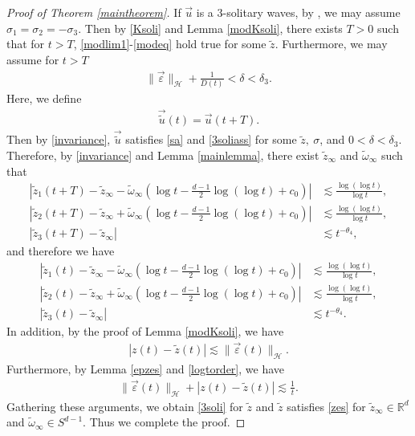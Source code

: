 \documentclass[reqno]{amsart}
\theoremstyle{plain}
\theoremstyle{definition}
\numberwithin{equation}{section}
\newcommand{\1}{\mathbbm{1}}
\begin{document}
\begin{proof}[Proof of Theorem \ref{maintheorem}]
If $\vec{u}$ is a $3$-solitary waves, by \cite[Theorem 1.8]{CD}, we may assume $\sigma_1=\sigma_2=-\sigma_3$. Then by \eqref{Ksoli} and Lemma \ref{modKsoli}, there exists $T>0$ such that for $t>T$, \eqref{modlim1}-\eqref{modeq} hold true for some $\tilde{z}$. Furthermore, we may assume for $t>T$
\begin{align*}
\|\vec{\varepsilon}\|_{\mathcal{H}}+\frac{1}{D(t)}<\delta<\delta_3.
\end{align*}
Here, we define 
\begin{align*}
\vec{\tilde{u}}(t)=\vec{u}(t+T).
\end{align*}
Then by \eqref{invariance}, $\vec{\tilde{u}}$ satisfies \eqref{sa} and \eqref{3soliass} for some $\tilde{z},\ \sigma$, and $0<\delta<\delta_3$. Therefore, by \eqref{invariance} and Lemma \ref{mainlemma}, there exist $\tilde{z}_{\infty}$ and $\tilde{\omega}_{\infty}$ such that 
\begin{align*}
\left|\tilde{z}_1(t+T)-\tilde{z}_{\infty}-\tilde{\omega}_{\infty}\left(\log{t}-\frac{d-1}{2}\log{(\log{t})}+c_0\right)\right|&\lesssim \frac{\log{(\log{t})}}{\log{t}}, 
\\
\left|\tilde{z}_2(t+T)-\tilde{z}_{\infty}+\tilde{\omega}_{\infty}\left(\log{t}-\frac{d-1}{2}\log{(\log{t})}+c_0\right)\right|&\lesssim \frac{\log{(\log{t})}}{\log{t}}, 
\\
\left|\tilde{z}_3(t+T)-\tilde{z}_{\infty}\right|&\lesssim t^{-\theta_4},
\end{align*} 
and therefore we have
\begin{align*}
\left|\tilde{z}_1(t)-\tilde{z}_{\infty}-\tilde{\omega}_{\infty}\left(\log{t}-\frac{d-1}{2}\log{(\log{t})}+c_0\right)\right|&\lesssim \frac{\log{(\log{t})}}{\log{t}}, 
\\
\left|\tilde{z}_2(t)-\tilde{z}_{\infty}+\tilde{\omega}_{\infty}\left(\log{t}-\frac{d-1}{2}\log{(\log{t})}+c_0\right)\right|&\lesssim \frac{\log{(\log{t})}}{\log{t}}, 
\\
\left|\tilde{z}_3(t)-\tilde{z}_{\infty}\right|&\lesssim t^{-\theta_4}.
\end{align*}
In addition, by the proof of Lemma \ref{modKsoli}, we have
\begin{align*}
|z(t)-\tilde{z}(t)|\lesssim \|\vec{\varepsilon}(t)\|_{\mathcal{H}}.
\end{align*}
Furthermore, by Lemma \ref{epzes} and \eqref{logtorder}, we have
\begin{align*}
\|\vec{\varepsilon}(t)\|_{\mathcal{H}}+|z(t)-\tilde{z}(t)|\lesssim \frac{1}{t}.
\end{align*}
Gathering these arguments, we obtain \eqref{3soli} for $\tilde{z}$ and $\tilde{z}$ satisfies \eqref{zes} for $\tilde{z}_{\infty}\in \mathbb{R}^d$ and $\tilde{\omega}_{\infty}\in S^{d-1}$. Thus we complete the proof.
\end{proof}
\end{document}
